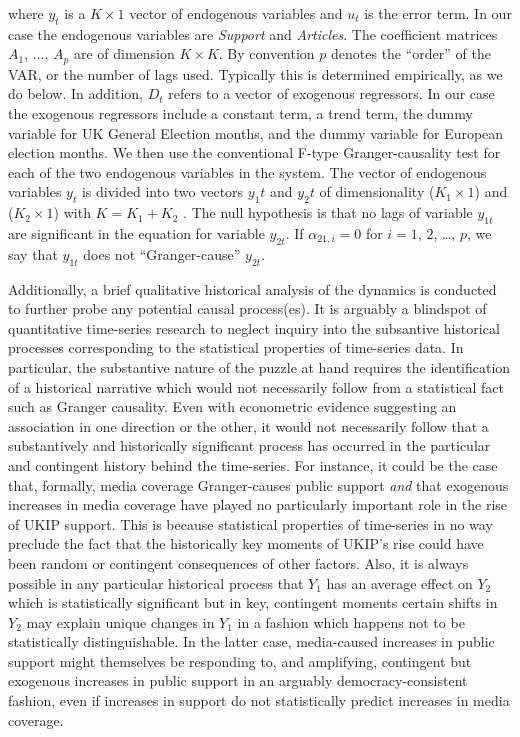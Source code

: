 \documentclass[12pt,]{article}
\begin{document}
where \(y_t\) is a \(K \times 1\) vector of endogenous variables and
\(u_t\) is the error term. In our case the endogenous variables are
\emph{Support} and \emph{Articles}. The coefficient matrices \(A_1\),
\(\dots\), \(A_p\) are of dimension \(K \times K\). By convention \(p\)
denotes the ``order'' of the VAR, or the number of lags used. Typically
this is determined empirically, as we do below. In addition, \(D_t\)
refers to a vector of exogenous regressors. In our case the exogenous
regressors include a constant term, a trend term, the dummy variable for
UK General Election months, and the dummy variable for European election
months. We then use the conventional F-type Granger-causality test for
each of the two endogenous variables in the system. The vector of
endogenous variables \(y_t\) is divided into two vectors \(y_1t\) and
\(y_2t\) of dimensionality (\(K_1 \times 1\)) and (\(K_2 \times 1\))
with \(K = K_1 + K_2\) \citep{Pfaff:2008wk}. The null hypothesis is that
no lags of variable \(y_{1t}\) are significant in the equation for
variable \({y}_{2t}\). If \(\alpha_{21, i} = 0\) for \(i = 1\), \(2\),
\ldots{}, \(p\), we say that \(y_{1t}\) does not ``Granger-cause''
\(y_{2t}\).

Additionally, a brief qualitative historical analysis of the dynamics is
conducted to further probe any potential causal process(es). It is
arguably a blindspot of quantitative time-series research to neglect
inquiry into the subsantive historical processes corresponding to the
statistical properties of time-series data. In particular, the
substantive nature of the puzzle at hand requires the identification of
a historical narrative which would not necessarily follow from a
statistical fact such as Granger causality. Even with econometric
evidence suggesting an association in one direction or the other, it
would not necessarily follow that a substantively and historically
significant process has occurred in the particular and contingent
history behind the time-series. For instance, it could be the case that,
formally, media coverage Granger-causes public support \emph{and} that
exogenous increases in media coverage have played no particularly
important role in the rise of UKIP support. This is because statistical
properties of time-series in no way preclude the fact that the
historically key moments of UKIP's rise could have been random or
contingent consequences of other factors. Also, it is always possible in
any particular historical process that \(Y_1\) has an average effect on
\(Y_2\) which is statistically significant but in key, contingent
moments certain shifts in \(Y_2\) may explain unique changes in \(Y_1\)
in a fashion which happens not to be statistically distinguishable. In
the latter case, media-caused increases in public support might
themselves be responding to, and amplifying, contingent but exogenous
increases in public support in an arguably democracy-consistent fashion,
even if increases in support do not statistically predict increases in
media coverage.
\end{document}
